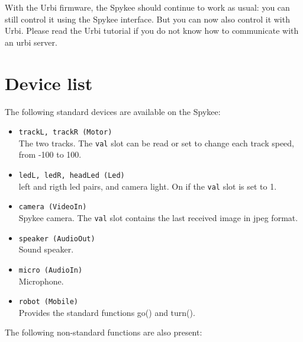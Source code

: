 With the Urbi firmware, the Spykee should continue to work as usual: you can
still control it using the Spykee interface. But you can now also control it
with Urbi. Please read the Urbi tutorial if you do not know how to communicate
with an urbi server.

\section{Device list}

The following standard devices are available on the Spykee:

\begin{itemize}
\item \lstinline|trackL, trackR (Motor)| \\
    The two tracks. The \lstinline|val| slot can be read or set to change each
    track speed, from -100 to 100.
\item \lstinline|ledL, ledR, headLed (Led)| \\
    left and rigth led pairs, and camera light. On if the \lstinline|val| slot
    is set to 1.
\item \lstinline|camera (VideoIn)| \\
    Spykee camera. The \lstinline|val| slot contains the last received image
    in jpeg format.
\item \lstinline|speaker (AudioOut)| \\
    Sound speaker.
\item \lstinline|micro (AudioIn)| \\
    Microphone.
\item \lstinline|robot (Mobile)| \\
    Provides the standard functions go() and turn().
\end{itemize}

The following non-standard functions are also present:


